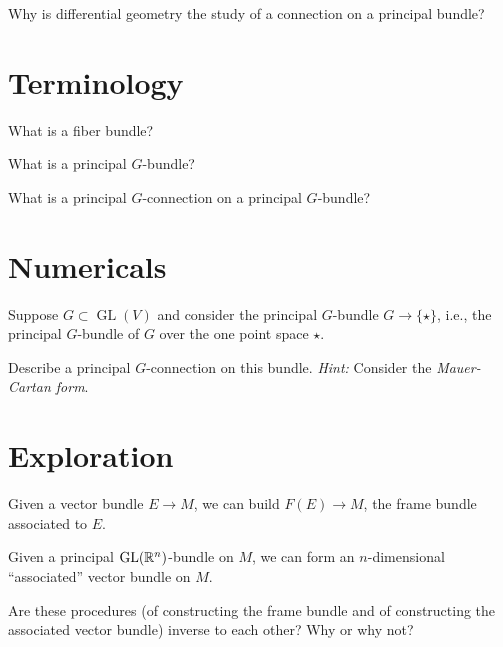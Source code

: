 \documentclass{homework}
\author{Jim Fowler}
\DeclareMathOperator{\GL}{GL}
\begin{document}
\maketitle

\begin{inspiration}
  Why is differential geometry the study of a connection on a principal bundle?
\end{inspiration}

\section{Terminology}

\begin{problem}
 What is a fiber bundle? 
\end{problem}

\begin{problem}
  What is a principal $G$-bundle?
\end{problem}

\begin{problem}
  What is a principal $G$-connection on a principal $G$-bundle? 
\end{problem}

\section{Numericals}

\begin{problem} Suppose $G \subset \GL(V)$ and consider the principal
$G$-bundle $G \to \{\star\}$, i.e., the principal $G$-bundle of $G$
over the one point space $\star$.
  
Describe a principal $G$-connection on this bundle.  \textit{Hint:}
 Consider the \textit{Mauer-Cartan form}.
\end{problem}

\section{Exploration}

\begin{problem} Given a vector bundle $E \to M$, we can build $F(E)
\to M$, the frame bundle associated to $E$.

  Given a principal $\GL(\R^n)$-bundle on $M$, we can form an
$n$-dimensional ``associated'' vector bundle on $M$.

Are these procedures (of constructing the frame bundle and of
constructing the associated vector bundle) inverse to each other?  Why
or why not?
\end{problem}
\end{document}
